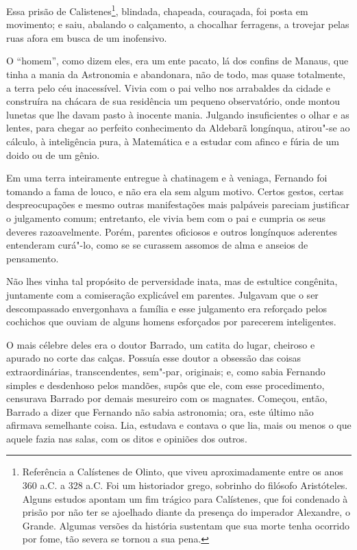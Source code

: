 Essa prisão de Calistenes\footnote{Referência a Calístenes de Olinto,
  que viveu aproximadamente entre os anos 360 a.C. a 328 a.C. Foi um
  historiador grego, sobrinho do filósofo Aristóteles. Alguns estudos
  apontam um fim trágico para Calístenes, que foi condenado à prisão por
  não ter se ajoelhado diante da presença do imperador Alexandre, o
  Grande. Algumas versões da história sustentam que sua morte tenha
  ocorrido por fome, tão severa se tornou a sua pena.}, blindada,
chapeada, couraçada, foi posta em movimento; e saiu, abalando o
calçamento, a chocalhar ferragens, a trovejar pelas ruas afora em busca
de um inofensivo.

O ``homem'', como dizem eles, era um ente pacato, lá dos confins de
Manaus, que tinha a mania da Astronomia e abandonara, não de todo, mas
quase totalmente, a terra pelo céu inacessível. Vivia com o pai velho
nos arrabaldes da cidade e construíra na chácara de sua residência um
pequeno observatório, onde montou lunetas que lhe davam pasto à inocente
mania. Julgando insuficientes o olhar e as lentes, para chegar ao
perfeito conhecimento da Aldebarã longínqua, atirou"-se ao cálculo, à
inteligência pura, à Matemática e a estudar com afinco e fúria de um
doido ou de um gênio.

Em uma terra inteiramente entregue à chatinagem e à veniaga, Fernando
foi tomando a fama de louco, e não era ela sem algum motivo. Certos
gestos, certas despreocupações e mesmo outras manifestações mais
palpáveis pareciam justificar o julgamento comum; entretanto, ele vivia
bem com o pai e cumpria os seus deveres razoavelmente. Porém, parentes
oficiosos e outros longínquos aderentes entenderam curá"-lo, como se se
curassem assomos de alma e anseios de pensamento.

Não lhes vinha tal propósito de perversidade inata, mas de estultice
congênita, juntamente com a comiseração explicável em parentes. Julgavam
que o ser descompassado envergonhava a família e esse julgamento era
reforçado pelos cochichos que ouviam de alguns homens esforçados por
parecerem inteligentes.

O mais célebre deles era o doutor Barrado, um catita do lugar, cheiroso
e apurado no corte das calças. Possuía esse doutor a obsessão das coisas
extraordinárias, transcendentes, sem"-par, originais; e, como sabia
Fernando simples e desdenhoso pelos mandões, supôs que ele, com esse
procedimento, censurava Barrado por demais mesureiro com os magnates.
Começou, então, Barrado a dizer que Fernando não sabia astronomia; ora,
este último não afirmava semelhante coisa. Lia, estudava e contava o que
lia, mais ou menos o que aquele fazia nas salas, com os ditos e opiniões
dos outros.

